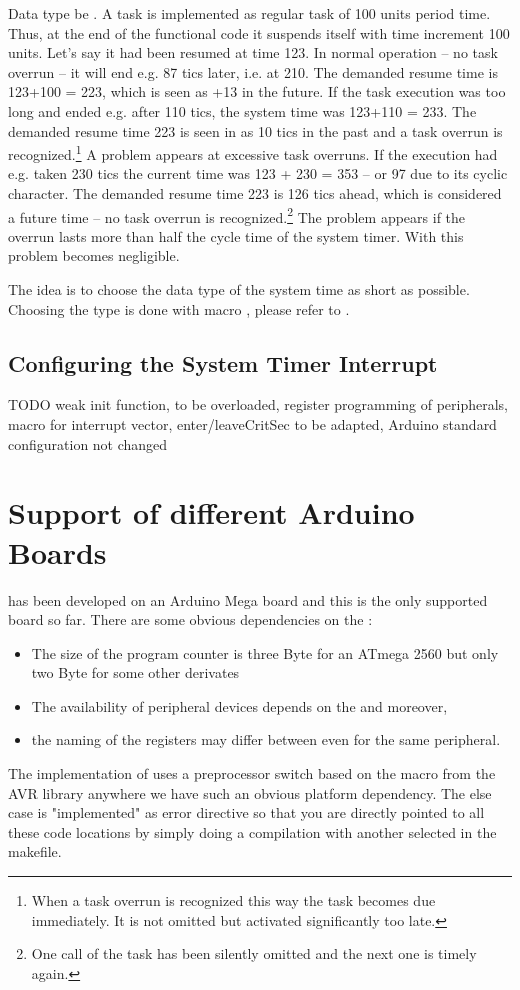 Data type be  . A task is implemented as regular task of
100 units period time. Thus, at the end of the functional code it suspends
itself with time increment 100 units. Let's say it had been resumed at
time 123. In normal operation -- no task overrun -- it will end e.g. 87
tics later, i.e. at 210. The demanded resume time is 123+100 = 223, which
is seen as +13 in the future. If the task execution was too long and ended
e.g. after 110 tics, the system time was 123+110 = 233. The demanded
resume time 223 is seen in as 10 tics in the past and a task overrun is
recognized.\footnote{When a task overrun is recognized this way the task
becomes due immediately. It is not omitted but activated significantly too
late.} A problem appears at excessive task overruns. If the execution had
e.g. taken 230 tics the current time was 123 + 230 = 353 -- or 97 due to
its cyclic character. The demanded resume time 223 is 126 tics ahead,
which is considered a future time -- no task overrun is
recognized.\footnote{One call of the task has been silently omitted and
the next one is timely again.} The problem appears if the overrun lasts
more than half the cycle time of the system timer. With 
this problem becomes negligible.

The idea is to choose the data type of the system time as short as
possible. Choosing the type is done with macro
, please refer to
.


\subsection{Configuring the System Timer Interrupt}

TODO weak init function, to be overloaded, register programming of
peripherals, macro for interrupt vector, enter/leaveCritSec to be adapted,
Arduino standard configuration
not changed


\section{Support of different Arduino Boards}
\label{secArduinoBoards}

\rtos{} has been developed on an Arduino Mega board and this is the only
supported board so far. There are some obvious dependencies on the \uC: 
\begin{itemize}
  \item The size of the program counter is three Byte for an ATmega 2560
    but only two Byte for some other derivates
  \item The availability of peripheral devices depends on the \uC{} and
    moreover,
  \item the naming of the registers may differ between \uC{} even for the same
    peripheral.
\end{itemize}
The implementation of \rtos{} uses a preprocessor switch based on the
macro  from the AVR library anywhere we have
such an obvious platform dependency. The else case is "implemented" as
error directive so that you are directly pointed to all these code locations
by simply doing a compilation with another \uC{} selected in the makefile.

